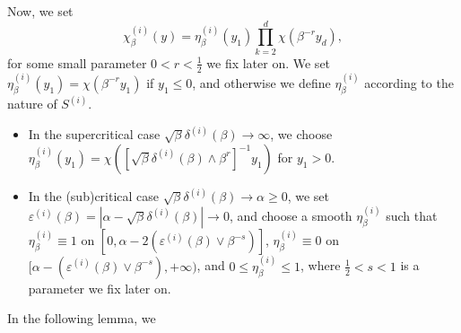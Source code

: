 \documentclass[10pt]{article}
\newcommand{\1}{\mathbbm 1}
\newcommand{\deltai }{\delta^{(i)}}
\begin{document}
    Now, we set 
    \begin{equation}
        \label{eq:harm_cutoff}
        \chi_\beta^{(i)}(y) = \eta_{\beta}^{(i)}(y_1)\prod_{k=2}^d \chi(\beta^{-r}y_d),
    \end{equation}
    for some small parameter $0<r<\frac12$ we fix later on.
    We set $\eta_\beta^{(i)}(y_1) = \chi(\beta^{-r}y_1)$ if $y_1\leq 0$, and otherwise we define $\eta_\beta^{(i)}$ according to the nature of $S^{(i)}$.

    \begin{itemize}
        \item In the supercritical case $\sqrt\beta\deltai(\beta) \to \infty$, we choose $\eta_\beta^{(i)}(y_1) = \chi\left(\left[\sqrt{\beta}\deltai(\beta) \land \beta^{r}\right]^{-1}y_1\right)$ for $y_1>0$.
        \item In the (sub)critical case $\sqrt\beta\deltai(\beta)\to \alpha \geq 0$, we set $\varepsilon^{(i)}(\beta) = |\alpha - \sqrt\beta\deltai(\beta)| \to 0$, and choose a smooth $\eta_\beta^{(i)}$ such that $\eta_\beta^{(i)} \equiv 1$ on $[0,\alpha-2(\varepsilon^{(i)}(\beta)\lor \beta^{-s})]$, $\eta_\beta^{(i)}\equiv 0$ on $[\alpha-(\varepsilon^{(i)}(\beta)\lor \beta^{-s}),+\infty)$, and $0\leq \eta_\beta^{(i)}\leq 1$, where $\frac12<s<1$ is a parameter we fix later on.
    \end{itemize}

    In the following lemma, we 
\end{document}
